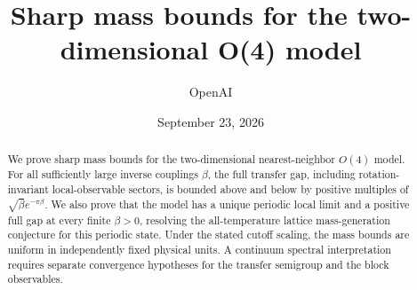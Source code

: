 \documentclass[11pt]{article}
\title{Sharp mass bounds for the two-dimensional O(4) model}
\author{OpenAI}
\date{September 23, 2026}
\numberwithin{equation}{section}
\theoremstyle{definition}
\theoremstyle{remark}
\begin{document}
\maketitle
\begin{abstract}
We prove sharp mass bounds for the two-dimensional nearest-neighbor $O(4)$
model. For all sufficiently large inverse couplings $\beta$, the full transfer
gap, including rotation-invariant local-observable sectors, is bounded above
and below by positive multiples of $\sqrt\beta e^{-\pi\beta}$. We also prove
that the model has a unique periodic local limit and a positive full gap at
every finite $\beta>0$, resolving the all-temperature lattice mass-generation
conjecture for this periodic state. Under the stated cutoff scaling, the mass
bounds are uniform in independently fixed physical units. A continuum spectral
interpretation requires separate convergence hypotheses for the transfer
semigroup and the block observables.
\end{abstract}
\vspace*{-12pt}
\tableofcontents
\newpage









\FloatBarrier

\FloatBarrier

\appendix






\end{document}
